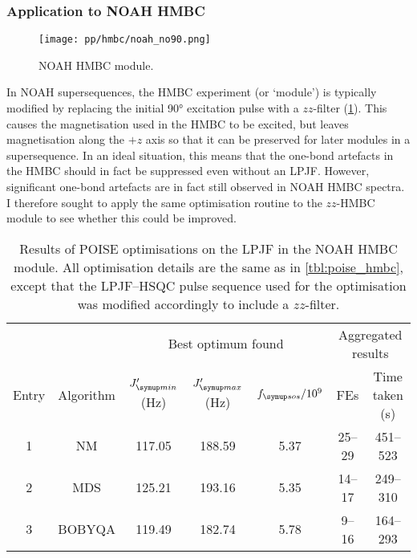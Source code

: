 \subsubsection{Application to NOAH HMBC}

\begin{figure}[htb]
    \centering
    \texttt{[image: pp/hmbc/noah\_no90.png]}%
    \caption[NOAH HMBC module]{
        NOAH HMBC module.
    }
    \label{fig:noah_hmbc_no90}
\end{figure}

In NOAH supersequences, the HMBC experiment (or `module') is typically modified by replacing the initial \ang{90} excitation pulse with a $zz$-filter (\cref{fig:noah_hmbc_no90}).\autocite{Kupce2018CC,Kupce2019JMR}
This causes the  magnetisation used in the HMBC to be excited, but leaves  magnetisation along the $+z$ axis so that it can be preserved for later modules in a supersequence.
In an ideal situation, this means that the one-bond artefacts in the HMBC should in fact be suppressed even without an LPJF.
However, significant one-bond artefacts are in fact still observed in NOAH HMBC spectra.
I therefore sought to apply the same optimisation routine to the $zz$-HMBC module to see whether this could be improved.


\begin{table}[htb]
    \centering
    \begin{tabular}{ccccccc}
        \toprule
              &           & \multicolumn{3}{c}{Best optimum found} & \multicolumn{2}{c}{Aggregated results} \\
        \cmidrule(lr){3-5} \cmidrule(lr){6-7}
        Entry & Algorithm & $\Jmin'$ (\unit{\Hz}) & $\Jmax'$ (\unit{\Hz}) & $\fsos / 10^9$ & FEs & Time taken (\unit{\s}) \\
        \midrule
        1     & NM        & 117.05 & 188.59                 & 5.37 & 25--29 & 451--523 \\
        2     & MDS       & 125.21 & 193.16                 & 5.35 & 14--17 & 249--310 \\
        3     & BOBYQA    & 119.49 & 182.74                 & 5.78 & 9--16  & 164--293 \\
        \bottomrule
    \end{tabular}
    \caption[NOAH HMBC low-pass J-filter optimisations]{
        Results of POISE optimisations on the LPJF in the NOAH HMBC module.
        All optimisation details are the same as in \cref{tbl:poise_hmbc}, except that the LPJF--HSQC pulse sequence used for the optimisation was modified accordingly to include a $zz$-filter.
    }
    \label{tbl:poise_hmbc_noah}
\end{table}


